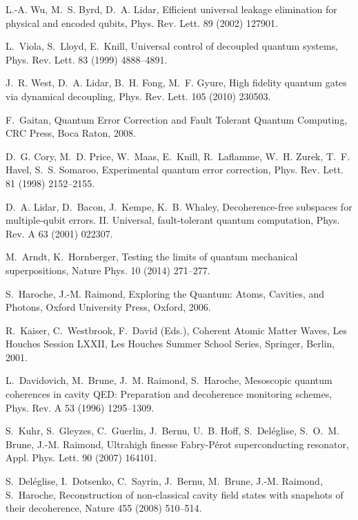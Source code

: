 \documentclass[3p,sort&compress,12pt]{elsarticle}
\begin{document}
\begin{thebibliography}{100}
L.-A. Wu, M.~S. Byrd, D.~A. Lidar, Efficient universal leakage elimination for
  physical and encoded qubits, Phys. Rev. Lett. 89 (2002) 127901.

L.~Viola, S.~Lloyd, E.~Knill, Universal control of decoupled quantum systems,
  Phys. Rev. Lett. 83 (1999) 4888--4891.

J.~R. West, D.~A. Lidar, B.~H. Fong, M.~F. Gyure, High fidelity quantum gates
  via dynamical decoupling, Phys. Rev. Lett. 105 (2010) 230503.

F.~Gaitan, Quantum Error Correction and Fault Tolerant Quantum Computing, CRC
  Press, Boca Raton, 2008.

D.~G. Cory, M.~D. Price, W.~Maas, E.~Knill, R.~Laflamme, W.~H. Zurek, T.~F.
  Havel, S.~S. Somaroo, Experimental quantum error correction, Phys. Rev. Lett.
  81 (1998) 2152--2155.

D.~A. Lidar, D.~Bacon, J.~Kempe, K.~B. Whaley, Decoherence-free subspaces for
  multiple-qubit errors. {II.} {U}niversal, fault-tolerant quantum computation,
  Phys. Rev. A 63 (2001) 022307.

M.~Arndt, K.~Hornberger, Testing the limits of quantum mechanical
  superpositions, Nature Phys. 10 (2014) 271--277.

S.~Haroche, J.-M. Raimond, Exploring the Quantum: Atoms, Cavities, and Photons,
  Oxford University Press, Oxford, 2006.

R.~Kaiser, C.~Westbrook, F.~David (Eds.), Coherent Atomic Matter Waves, Les
  Houches Session LXXII, Les Houches Summer School Series, Springer, Berlin,
  2001.

L.~Davidovich, M.~Brune, J.~M. Raimond, S.~Haroche, Mesoscopic quantum
  coherences in cavity {QED}: Preparation and decoherence monitoring schemes,
  Phys. Rev. A 53 (1996) 1295--1309.

S.~Kuhr, S.~Gleyzes, C.~Guerlin, J.~Bernu, U.~B. Hoff, S.~Del{\'e}glise,
  S.~O.~M. Brune, J.-M. Raimond, Ultrahigh finesse {F}abry-{P}{\'e}rot
  superconducting resonator, Appl. Phys. Lett. 90 (2007) 164101.

S.~Del{\'e}glise, I.~Dotsenko, C.~Sayrin, J.~Bernu, M.~Brune, J.-M. Raimond,
  S.~Haroche, Reconstruction of non-classical cavity field states with
  snapshots of their decoherence, Nature 455 (2008) 510--514.


\end{thebibliography}
\end{document}
